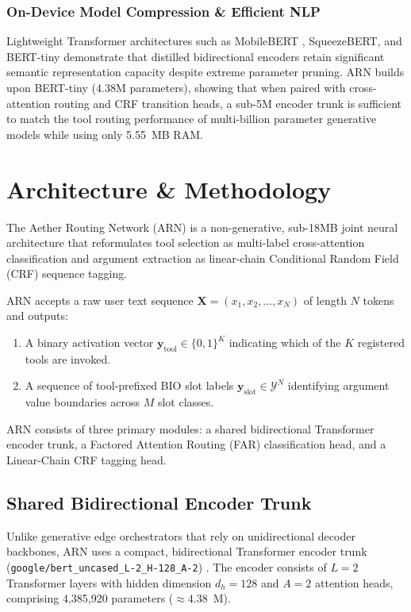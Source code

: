 \documentclass[conference]{IEEEtran}
\begin{document}
\subsubsection{On-Device Model Compression \& Efficient NLP}
Lightweight Transformer architectures such as MobileBERT \cite{sun2020mobilebert}, SqueezeBERT, and BERT-tiny \cite{turc2019well} demonstrate that distilled bidirectional encoders retain significant semantic representation capacity despite extreme parameter pruning. ARN builds upon BERT-tiny (4.38M parameters), showing that when paired with cross-attention routing and CRF transition heads, a sub-5M encoder trunk is sufficient to match the tool routing performance of multi-billion parameter generative models while using only 5.55~MB RAM.


\section{Architecture \& Methodology}

The Aether Routing Network (ARN) is a non-generative, sub-18MB joint neural architecture that reformulates tool selection as multi-label cross-attention classification and argument extraction as linear-chain Conditional Random Field (CRF) sequence tagging.

ARN accepts a raw user text sequence $\mathbf{X} = (x_1, x_2, \dots, x_N)$ of length $N$ tokens and outputs:
\begin{enumerate}
    \item A binary activation vector $\mathbf{y}_{\text{tool}} \in \{0, 1\}^K$ indicating which of the $K$ registered tools are invoked.
    \item A sequence of tool-prefixed BIO slot labels $\mathbf{y}_{\text{slot}} \in \mathcal{Y}^N$ identifying argument value boundaries across $M$ slot classes.
\end{enumerate}
ARN consists of three primary modules: a shared bidirectional Transformer encoder trunk, a Factored Attention Routing (FAR) classification head, and a Linear-Chain CRF tagging head.

\subsection{Shared Bidirectional Encoder Trunk}
Unlike generative edge orchestrators that rely on unidirectional decoder backbones, ARN uses a compact, bidirectional Transformer encoder trunk (\texttt{google/bert\_uncased\_L-2\_H-128\_A-2}) \cite{devlin2019bert}. The encoder consists of $L=2$ Transformer layers with hidden dimension $d_h=128$ and $A=2$ attention heads, comprising 4,385,920 parameters ($\approx 4.38$~M).
\end{document}

